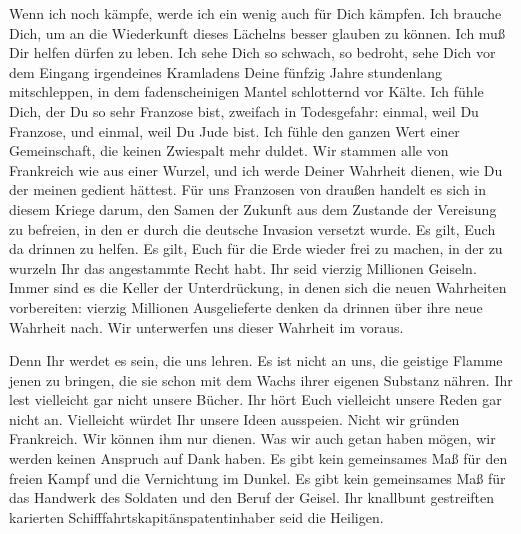 \documentclass[12pt,ngerman,parskip=half]{scrartcl}
\begin{document}
Wenn ich noch kämpfe, werde ich ein wenig auch für Dich kämpfen. Ich brauche Dich, um an die Wiederkunft dieses Lächelns besser glauben zu können. Ich muß Dir helfen dürfen zu leben. Ich sehe Dich so schwach, so bedroht, sehe Dich vor dem Eingang irgendeines Kramladens Deine fünfzig Jahre stundenlang mitschleppen, in dem fadenscheinigen Mantel schlotternd vor Kälte. Ich fühle Dich, der Du so sehr Franzose bist, zweifach in Todesgefahr: einmal, weil Du Franzose, und einmal, weil Du Jude bist. Ich fühle den ganzen Wert einer Gemeinschaft, die keinen Zwiespalt mehr duldet. Wir stammen alle von Frankreich wie aus einer Wurzel, und ich werde Deiner Wahrheit dienen, wie Du der meinen gedient hättest. Für uns Franzosen von draußen handelt es sich in diesem Kriege darum, den Samen der Zukunft aus dem Zustande der Vereisung zu befreien, in den er durch die deutsche Invasion versetzt wurde. Es gilt, Euch da drinnen zu helfen. Es gilt, Euch für die Erde wieder frei zu machen, in der zu wurzeln Ihr das angestammte Recht habt. Ihr seid vierzig Millionen Geiseln. Immer sind es die Keller der Unterdrückung, in denen sich die neuen Wahrheiten vorbereiten: vierzig Millionen Ausgelieferte denken da drinnen über ihre neue Wahrheit nach. Wir unterwerfen uns dieser Wahrheit im voraus.

Denn Ihr werdet es sein, die uns lehren. Es ist nicht an uns, die geistige Flamme jenen zu bringen, die sie schon mit dem Wachs ihrer eigenen Substanz nähren. Ihr lest vielleicht gar nicht unsere Bücher. Ihr hört Euch vielleicht unsere Reden gar nicht an. Vielleicht würdet Ihr unsere Ideen ausspeien. Nicht wir gründen Frankreich. Wir können ihm nur dienen. Was wir auch getan haben mögen, wir werden keinen Anspruch auf Dank haben. Es gibt kein gemeinsames Maß für den freien Kampf und die Vernichtung im Dunkel. Es gibt kein gemeinsames Maß für das Handwerk des Soldaten und den Beruf der Geisel. Ihr knallbunt gestreiften karierten Schiff\-fahrts\-kapi\-täns\-pa\-tent\-in\-ha\-ber seid die Heiligen.
\end{document}

